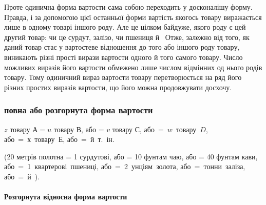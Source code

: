 Проте одинична форма вартости сама собою переходить у досконалішу
форму. Правда, і за допомогою цієї останньої форми вартість
якогось товару виражається лише в одному товарі іншого
роду. Але це цілком байдуже, якого роду є цей другий товар: чи
це сурдут, залізо, чи пшениця й~ Отже, залежно від того,
як даний товар стає у вартостеве відношення до того або іншого
роду товару, виникають різні прості вирази вартости одного й
того самого товару. Число можливих виразів його вартости
обмежено лише числом відмінних од нього родів товару. Тому
одиничний вираз вартости товару перетворюється на ряд його
різних простих виразів вартости, що його можна продовжувати
досхочу.

\subsubsection{повна або розгорнута форма вартости}
\begin{center}
$z$ товару $А = u$ товару $В$, або = $v$ товару $С$, \mbox{або = $w$ товару $D$},\\
\mbox{або = $х$ товару $Е$},  \mbox{або = й т. ін}.

{\small (20 метрів полотна = 1 сурдутові, або = 10 фунтам чаю, або = 40 фунтам
кави, \mbox{або = 1 квартерові пшениці}, \mbox{або = 2 унціям золота},
\mbox{або =  тонни заліза}, \mbox{або = й~).}}
\end{center}

\paragraph{Розгорнута відносна форма вартости}

